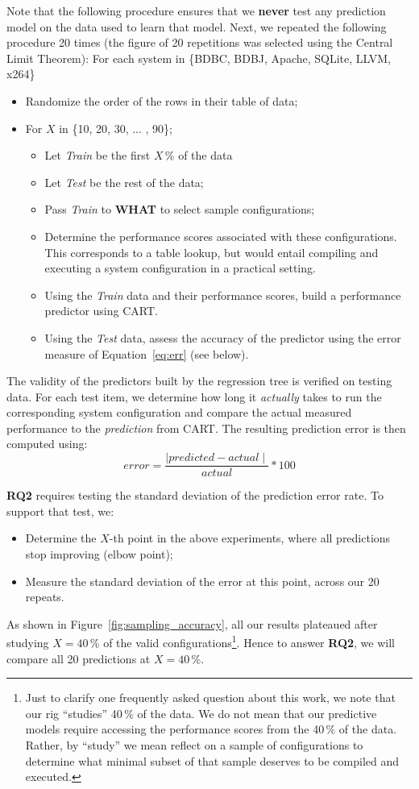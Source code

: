 \documentclass{newsig}
\newcommand{\eq}[1]{Equation~\ref{eq:#1}}
\newcommand{\what}{{\bf WHAT }}
\begin{document}
Note that the following procedure ensures that
we \textbf{never} test any prediction model on the data used to learn that model. Next, we repeated the following procedure 20 times (the figure of 20 repetitions was
selected using the Central Limit Theorem): 
For each system in \{BDBC, BDBJ, Apache, SQLite, LLVM, x264\}
\begin{itemize}
\item Randomize the order of the rows in their table of data;
\item For $X$ in \{10, 20, 30, ... , 90\};
\begin{itemize}
\item Let {\em Train} be the first $X$\,\% of the data 
\item Let {\em Test} be the rest of the data;
\item Pass {\em Train} to \what to select   sample   configurations;
\item Determine the performance scores associated with these configurations. This corresponds to a table lookup, but would entail compiling and executing a system configuration in a practical setting.
\item Using the {\em Train}  data and their performance scores, build a performance predictor using CART.
\item Using the {\em Test} data, assess the accuracy of the predictor using the error 
measure of \eq{err} (see below).
\end{itemize}
\end{itemize}


The validity of the predictors built by the regression tree is verified on testing data. 
For each  test item, we determine how long it {\em actually} takes to run the corresponding system configuration and compare the actual measured performance to the {\em prediction} from CART. The resulting prediction error is then computed using:
\begin{equation}\label{eq:err}
\mathit{error}=\frac{\mid\mathit{predicted} - \mathit{actual}\mid}{\mathit{actual}}*100
\end{equation}

{\bf RQ2} requires testing the standard deviation of the prediction error rate. To support that test, we:
\begin{itemize}
\item Determine the $X$-th point in the above experiments, where all predictions stop improving (elbow point);
\item Measure the standard deviation of the error at this point, across our 20 repeats.
\end{itemize}
As shown in Figure~\ref{fig:sampling_accuracy}, all our results plateaued after studying $X=40$\,\% of the valid configurations\footnote{Just to clarify one frequently asked question about this work, we note
that our rig ``studies'' 40\,\% of the data. We do not mean that our predictive models
 require accessing the performance scores from the 40\,\% of the data. Rather, by ``study'' we mean   reflect 
 on a sample of configurations to determine what minimal subset of that
sample deserves to be compiled and executed.}.
 Hence to answer {\bf RQ2}, we will compare all 20 predictions at $X=40$\,\%.
 
\end{document}
